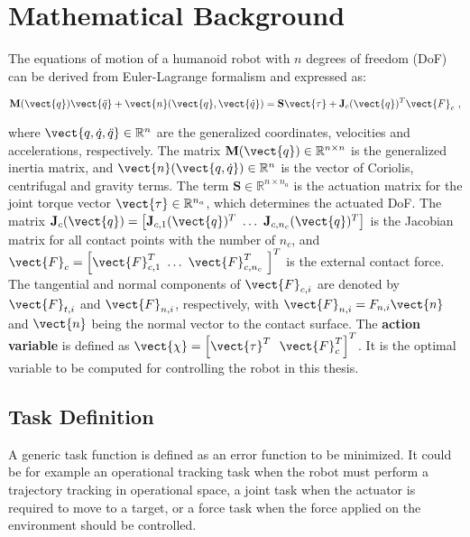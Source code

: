 \section{Mathematical Background}
\label{sec:math}
The equations of motion of a humanoid robot with $n$ degrees of freedom (DoF) can be derived from Euler-Lagrange formalism and expressed as:
\begin{singlespace}
\begin{equation}\label{eq:dynamic model}
    \mathbf{M}(\vect{q}) \vect{\ddot{q}} +\vect{n}(\vect{q},\vect{\dot{q}}) =  \mathbf{S}\vect{\tau}+\mathbf{J}_c(\vect{q})^T\vect{F}_c ~,
\end{equation}
\end{singlespace}
\noindent where $\vect{q,\dot{q},\ddot{q}} \in \mathbb{R}^n$ are the generalized coordinates, velocities and accelerations, respectively. The matrix $\mathbf{M}(\vect{q}) \in \mathbb{R}^{n \times n}$ is the generalized inertia matrix, and $\vect{n}(\vect{q,\dot{q}}) \in \mathbb{R}^n$ is the vector of Coriolis, centrifugal and gravity terms. The term $\mathbf{S} \in \mathbb{R}^{n\times n_{a}} $ is the actuation matrix for the joint torque vector $\vect{\tau} \in \mathbb{R}^{n_{a}}$, which determines the actuated DoF. The matrix $\mathbf{J}_c(\vect{q})= \left[\mathbf{J}_{c,1}(\vect{q})^{T}~ \dots~ \mathbf{J}_{c,n_c}(\vect{q})^{T} \right]$ is the Jacobian matrix for all contact points with the number of $n_{c}$, and $\vect{F}_c= \left[ \vect{F}_{c,1}^T~ \dots~ \vect{F}_{c,n_{c}}^T~ \right]^T$ is the external contact force. The tangential and normal components of $\vect{F}_{c,i}$ are denoted by $\vect{F}_{t,i}$ and $\vect{F}_{n,i}$, respectively, with $\vect{F}_{n,i} = F_{n,i}\vect{n}$ and $\vect{n}$ being the normal vector to the contact surface. The \textbf{action variable} is defined as $\vect{\chi} = \left[\vect{\tau}^{T} ~~ \vect{F}_c^T\right]^T$. It is the optimal variable to be computed for controlling the robot in this thesis.


\subsection{Task Definition}
A generic task function is defined as an error function to be minimized. It could be for example an operational tracking task when the robot must perform a trajectory tracking in operational space, a joint task when the actuator is required to move to a target, or a force task when the force applied on the environment should be controlled.  

